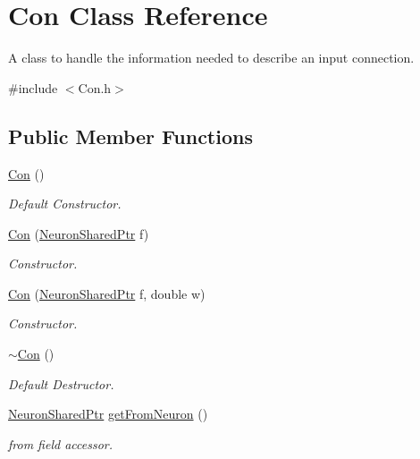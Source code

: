 \hypertarget{class_con}{
\section{Con Class Reference}
\label{class_con}
}


A class to handle the information needed to describe an input connection.  




{\ttfamily \#include $<$Con.h$>$}

\subsection*{Public Member Functions}
\begin{DoxyCompactItemize}
\item 
\hyperlink{class_con_a61621054cc1ee979385c81207ee0bceb}{Con} ()
\begin{DoxyCompactList}\small\item\em Default Constructor. \end{DoxyCompactList}\item 
\hyperlink{class_con_ab9ff17d0dfcd09549f87228eb5b39593}{Con} (\hyperlink{_a_m_o_r_e_8h_a03051950b0faf9499d14cf376e04c329}{NeuronSharedPtr} f)
\begin{DoxyCompactList}\small\item\em Constructor. \end{DoxyCompactList}\item 
\hyperlink{class_con_ab49e9dfa309ccf51d2cbc0ad7f219717}{Con} (\hyperlink{_a_m_o_r_e_8h_a03051950b0faf9499d14cf376e04c329}{NeuronSharedPtr} f, double w)
\begin{DoxyCompactList}\small\item\em Constructor. \end{DoxyCompactList}\item 
\hyperlink{class_con_a703b044611253c7a0a9e057ed62a3d22}{$\sim$Con} ()
\begin{DoxyCompactList}\small\item\em Default Destructor. \end{DoxyCompactList}\item 
\hyperlink{_a_m_o_r_e_8h_a03051950b0faf9499d14cf376e04c329}{NeuronSharedPtr} \hyperlink{class_con_a93bb48dcfd631d4f6346e1b900bc3aa0}{getFromNeuron} ()
\begin{DoxyCompactList}\small\item\em from field accessor. \end{DoxyCompactList}\item 

\end{DoxyCompactItemize}
